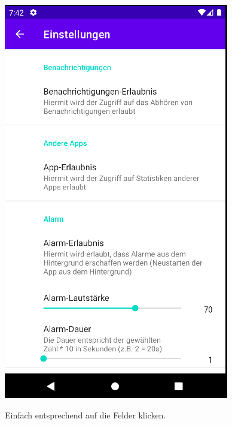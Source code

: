 \documentclass{article}
\begin{document}
\begin{center}
    \includegraphics[scale=0.4]{settings_per.png}
\end{center}
Einfach entsprechend auf die Felder klicken.



\newpage
\end{document}
